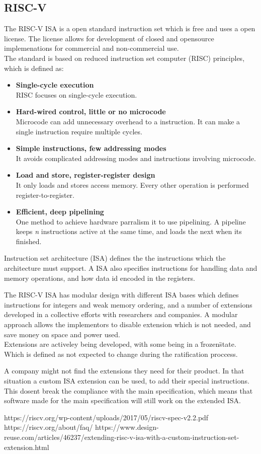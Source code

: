 \subsection{RISC-V}
The RISC-V ISA is a open standard instruction set which is free and uses a open license. The license allows for development of closed and opensource implemenations for commercial and non-commercial use.\\
The standard is based on reduced instruction set computer (RISC) principles, which is defined as:
\begin{itemize}
    \item \textbf{Single-cycle execution}\\RISC focuses on single-cycle execution.
    \item \textbf{Hard-wired control, little or no microcode}\\Microcode can add unnecessary overhead to a instruction. It can make a single instruction require multiple cycles.
    \item \textbf{Simple instructions, few addressing modes}\\It avoids complicated addressing modes and instructions involving microcode. 
    \item \textbf{Load and store, register-register design}\\It only loads and stores access memory. Every other operation is performed register-to-register.
    \item \textbf{Efficient, deep pipelining}\\One method to achieve hardware parralism it to use pipelining. A pipeline keeps \textit{n} instructions active at the same time, and loads the next when its finished.
\end{itemize}

Instruction set architecture (ISA) defines the the instructions which the architecture must support. A ISA also specifies instructions for handling data and memory operations, and how data id encoded in the registers.

The RISC-V ISA has modular design with different ISA bases which defines instructions for integers and weak memory ordering, and a number of extensions developed in a collective efforts with researchers and companies.
A modular approach allows the implementors to disable extension which is not needed, and save money on space and power used. \\
Extensions are activeley being developed, with some being in a \"frozen\" state. Which is defined as not expected to change during the ratification proccess.

A company might not find the extensions they need for their product. In that situation a custom ISA extension can be used, to add their special instructions. 
This dosent break the compliance with the main specification, which means that software made for the main specification will still work on the extended ISA.

https://riscv.org/wp-content/uploads/2017/05/riscv-spec-v2.2.pdf
https://riscv.org/about/faq/
https://www.design-reuse.com/articles/46237/extending-risc-v-isa-with-a-custom-instruction-set-extension.html